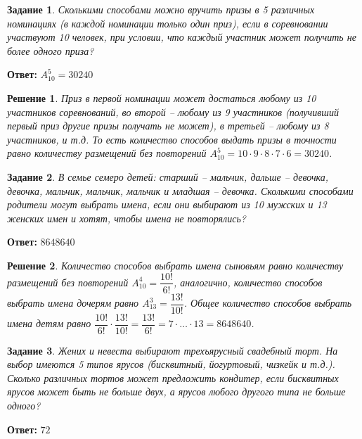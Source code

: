 \documentclass[a4paper,oneside]{memoir}
\newtheorem{task}{Задание}
\newtheorem{solution}{Решение}
\begin{document}
\hrulefill

\begin{task}
Сколькими способами можно вручить призы в 5 различных номинациях (в каждой номинации только один приз), если в соревновании участвуют 10 человек, при условии, что каждый участник может получить не более одного приза?
\end{task}

\textbf{Ответ:} $ A_{10}^5 = 30240 $

\begin{solution}
Приз в первой номинации может достаться любому из 10 участников соревнований, во второй -- любому из 9 участников (получивший первый приз другие призы получать не может), в третьей -- любому из 8 участников, и т.д. То есть количество способов выдать призы в точности равно количеству размещений без повторений $ A_{10}^5 = 10\cdot 9\cdot 8\cdot 7\cdot 6 = 30240 $.
\end{solution}

\hrulefill

\begin{task}
	В семье семеро детей: старший -- мальчик, дальше -- девочка, девочка, мальчик, мальчик, мальчик и младшая -- девочка. Сколькими способами родители могут выбрать имена, если они выбирают из 10 мужских и 13 женских имен и хотят, чтобы имена не повторялись?
\end{task}

\textbf{Ответ:} $ 8648640 $

\begin{solution}
	Количество способов выбрать имена сыновьям равно количеству размещений без повторений $ A_{10}^4=\dfrac{10!}{6!} $, аналогично, количество способов выбрать имена дочерям равно $ A_{13}^3 = \dfrac{13!}{10!} $. Общее количество способов выбрать имена детям равно $ \dfrac{10!}{6!}\cdot\dfrac{13!}{10!} = \dfrac{13!}{6!} = 7\cdot\ldots\cdot 13 = 8648640 $.
\end{solution}

\hrulefill

\begin{task}
	Жених и невеста выбирают трехъярусный свадебный торт. На выбор имеются 5 типов ярусов (бисквитный, йогуртовый, чизкейк и т.д.). Сколько различных тортов может предложить кондитер, если бисквитных ярусов может быть не больше двух, а ярусов любого другого типа не больше одного?
\end{task}

\textbf{Ответ:} $ 72 $
\end{document}
